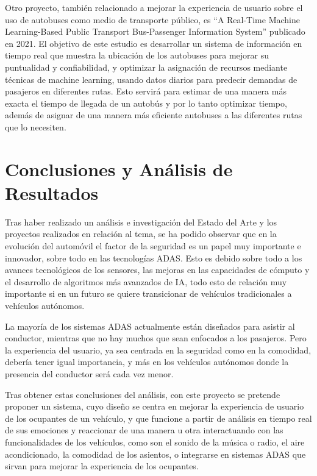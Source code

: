 \documentclass[12pt]{report} %
\begin{document}
Otro proyecto, también relacionado a mejorar la experiencia de usuario sobre el uso de autobuses como medio de transporte público, es “A Real-Time Machine Learning-Based Public Transport Bus-Passenger Information System” \cite{rw5} publicado en 2021. El objetivo de este estudio es desarrollar un sistema de información en tiempo real que muestra la ubicación de los autobuses para mejorar su puntualidad y confiabilidad, y optimizar la asignación de recursos mediante técnicas de machine learning, usando datos diarios para predecir demandas de pasajeros en diferentes rutas. Esto servirá para estimar de una manera más exacta el tiempo de llegada de un autobús y por lo tanto optimizar tiempo, además de asignar de una manera más eficiente autobuses a las diferentes rutas que lo necesiten.

\section{Conclusiones y Análisis de Resultados}

Tras haber realizado un análisis e investigación del Estado del Arte y los proyectos realizados en relación al tema, se ha podido observar que en la evolución del automóvil el factor de la seguridad es un papel muy importante e innovador, sobre todo en las tecnologías ADAS. Esto es debido sobre todo a los avances tecnológicos de los sensores, las mejoras en las capacidades de cómputo y el desarrollo de algoritmos más avanzados de IA, todo esto de relación muy importante si en un futuro se quiere transicionar de vehículos tradicionales a vehículos autónomos.

La mayoría de los sistemas ADAS actualmente están diseñados para asistir al conductor, mientras que no hay muchos que sean enfocados a los pasajeros. Pero la experiencia del usuario, ya sea centrada en la seguridad como en la comodidad, debería tener igual importancia, y más en los vehículos autónomos donde la presencia del conductor será cada vez menor.

Tras obtener estas conclusiones del análisis, con este proyecto se pretende proponer un sistema, cuyo diseño se centra en mejorar la experiencia de usuario de los ocupantes de un vehículo, y que funcione a partir de análisis en tiempo real de sus emociones y reaccionar de una manera u otra interactuando con las funcionalidades de los vehículos, como son el sonido de la música o radio, el aire acondicionado, la comodidad de los asientos, o integrarse en sistemas ADAS que sirvan para mejorar la experiencia de los ocupantes.
\end{document}
